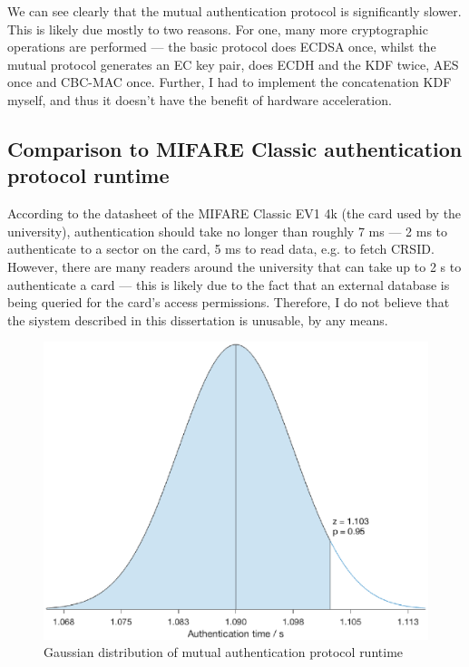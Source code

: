 \documentclass[12pt,a4paper,twoside,openright]{report}
\begin{document}
We can see clearly that the mutual authentication protocol is significantly slower. This is likely due mostly to two reasons. For one, many more cryptographic operations are performed --- the basic protocol does ECDSA once, whilst the mutual protocol generates an EC key pair, does ECDH and the KDF twice, AES once and CBC-MAC once. Further, I had to implement the concatenation KDF myself, and thus it doesn't have the benefit of hardware acceleration.

\subsection{Comparison to MIFARE Classic authentication protocol runtime}

According to the datasheet of the MIFARE Classic EV1 4k (the card used by the university), authentication should take no longer than roughly 7 ms --- 2 ms to authenticate to a sector on the card, 5 ms to read data, e.g. to fetch CRSID. However, there are many readers around the university that can take up to 2 s to authenticate a card --- this is likely due to the fact that an external database is being queried for the card's access permissions. Therefore, I do not believe that the siystem described in this dissertation is unusable, by any means.

\begin{figure}[tbh]
\centerline{\includegraphics[scale=0.8]{figures/mutualauthplot.eps}}
\caption{Gaussian distribution of mutual authentication protocol runtime}
\label{mutualauthplot}
\end{figure}
\end{document}
